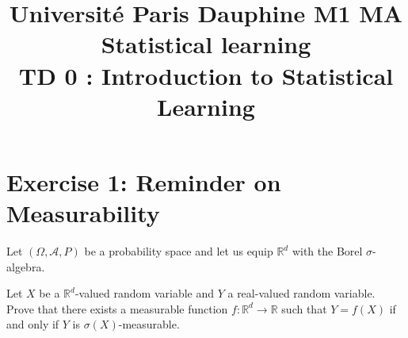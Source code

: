 \documentclass[12pt]{article}
\title{Université Paris Dauphine M1 MA\\Statistical learning\\TD 0 : Introduction to Statistical Learning}
\author{}
\date{}
\begin{document}
\maketitle

\section*{Exercise 1: Reminder on Measurability}
Let $(\Omega, \mathcal{A}, P)$ be a probability space and let us equip $\mathbb{R}^d$ with the Borel $\sigma$-algebra.

Let $X$ be a $\mathbb{R}^d$-valued random variable and $Y$ a real-valued random variable. Prove that there exists a measurable function $f : \mathbb{R}^d \to \mathbb{R}$ such that $Y = f(X)$ if and only if $Y$ is $\sigma(X)$-measurable.
\end{document}
